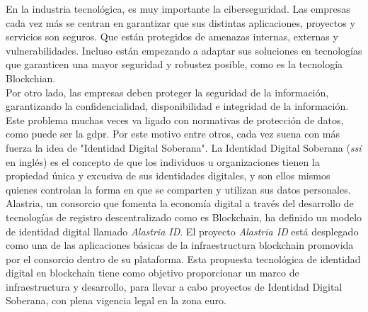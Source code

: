 
En la industria tecnológica, es muy importante la ciberseguridad. Las empresas cada vez más se centran en garantizar que sus distintas aplicaciones, proyectos y servicios son seguros. Que están protegidos de amenazas internas, externas y vulnerabilidades. Incluso están empezando a adaptar sus soluciones en tecnologías que garanticen una mayor seguridad y robustez posible, como es la tecnología Blockchian.\\

Por otro lado, las empresas deben proteger la seguridad de la información, garantizando la confidencialidad, disponibilidad e integridad de la información. Este problema muchas veces va ligado con normativas de protección de datos, como puede ser la \acrshort{gdpr}. Por este motivo entre otros, cada vez suena con más fuerza la idea de "Identidad Digital Soberana". La Identidad Digital Soberana (\textit{\acrlong{ssi}} en inglés) es el concepto de que los individuos u organizaciones tienen la propiedad única y excusiva de sus identidades digitales, y son ellos mismos quienes controlan la forma en que se comparten y utilizan sus datos personales.\\

Alastria, un consorcio que fomenta la economía digital a través del desarrollo de tecnologías de registro descentralizado como es Blockchain, ha definido un modelo de identidad digital llamado \textit{Alastria ID}. El proyecto \textit{Alastria ID} está desplegado como una de las aplicaciones básicas de la infraestructura blockchain promovida por el consorcio dentro de su plataforma. Esta propuesta tecnológica de identidad digital en blockchain tiene como objetivo proporcionar un marco de infraestructura y desarrollo, para llevar a cabo proyectos de Identidad Digital Soberana, con plena vigencia legal en la zona euro.\\


